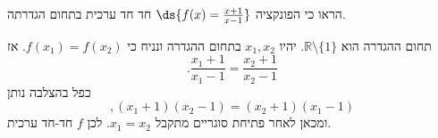 הראו כי הפונקציה
$\ds{f(x)=\frac{x+1}{x-1}}$
חד חד ערכית בתחום הגדרתה.

\begin{solbox}
תחום ההגדרה הוא $\mathbb{R}\setminus\{1\}$. יהיו $x_1,x_2$ בתחום ההגדרה ונניח כי $f(x_1)=f(x_2)$. אז
\[
.\frac{x_1+1}{x_1-1}=\frac{x_2+1}{x_2-1}
\]
כפל בהצלבה נותן
\[
,(x_1+1)(x_2-1)=(x_2+1)(x_1-1)
\]
ומכאן לאחר פתיחת סוגריים מתקבל $x_1=x_2$. לכן $f$ חד-חד ערכית.
\end{solbox}
